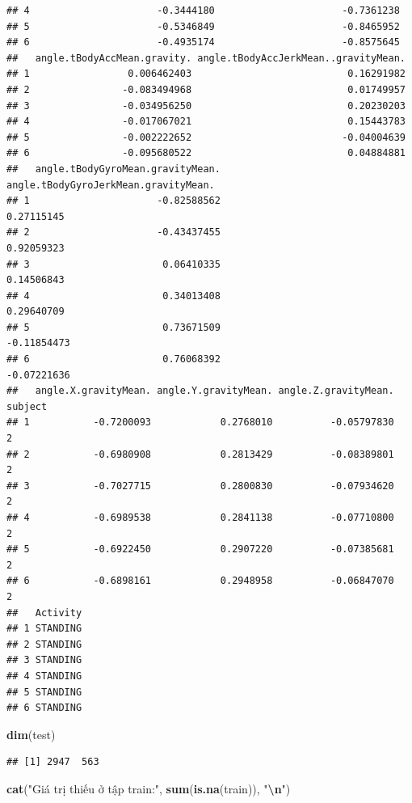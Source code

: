 \documentclass[
]{article}
\newenvironment{Shaded}{\begin{snugshade}}{\end{snugshade}}
\newcommand{\FunctionTok}[1]{\textcolor[rgb]{0.13,0.29,0.53}{\textbf{#1}}}
\newcommand{\NormalTok}[1]{#1}
\newcommand{\SpecialCharTok}[1]{\textcolor[rgb]{0.81,0.36,0.00}{\textbf{#1}}}
\newcommand{\StringTok}[1]{\textcolor[rgb]{0.31,0.60,0.02}{#1}}
\begin{document}
\begin{verbatim}
## 4                      -0.3444180                      -0.7361238
## 5                      -0.5346849                      -0.8465952
## 6                      -0.4935174                      -0.8575645
##   angle.tBodyAccMean.gravity. angle.tBodyAccJerkMean..gravityMean.
## 1                 0.006462403                           0.16291982
## 2                -0.083494968                           0.01749957
## 3                -0.034956250                           0.20230203
## 4                -0.017067021                           0.15443783
## 5                -0.002222652                          -0.04004639
## 6                -0.095680522                           0.04884881
##   angle.tBodyGyroMean.gravityMean. angle.tBodyGyroJerkMean.gravityMean.
## 1                      -0.82588562                           0.27115145
## 2                      -0.43437455                           0.92059323
## 3                       0.06410335                           0.14506843
## 4                       0.34013408                           0.29640709
## 5                       0.73671509                          -0.11854473
## 6                       0.76068392                          -0.07221636
##   angle.X.gravityMean. angle.Y.gravityMean. angle.Z.gravityMean. subject
## 1           -0.7200093            0.2768010          -0.05797830       2
## 2           -0.6980908            0.2813429          -0.08389801       2
## 3           -0.7027715            0.2800830          -0.07934620       2
## 4           -0.6989538            0.2841138          -0.07710800       2
## 5           -0.6922450            0.2907220          -0.07385681       2
## 6           -0.6898161            0.2948958          -0.06847070       2
##   Activity
## 1 STANDING
## 2 STANDING
## 3 STANDING
## 4 STANDING
## 5 STANDING
## 6 STANDING
\end{verbatim}

\begin{Shaded}
\begin{Highlighting}[]
\FunctionTok{dim}\NormalTok{(test)}
\end{Highlighting}
\end{Shaded}

\begin{verbatim}
## [1] 2947  563
\end{verbatim}

\begin{Shaded}
\begin{Highlighting}[]
\FunctionTok{cat}\NormalTok{(}\StringTok{"Giá trị thiếu ở tập train:"}\NormalTok{, }\FunctionTok{sum}\NormalTok{(}\FunctionTok{is.na}\NormalTok{(train)), }\StringTok{"}\SpecialCharTok{\textbackslash{}n}\StringTok{"}\NormalTok{)}
\end{Highlighting}
\end{Shaded}
\end{document}
